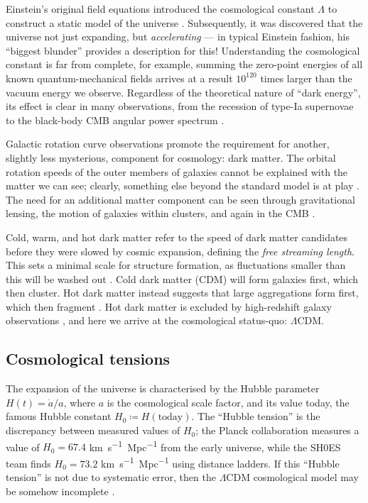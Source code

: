 \documentclass{article}
\begin{document}
Einstein's original field equations introduced the cosmological constant $\Lambda$ to construct a static model of the universe \cite{Einstein:1905ve}. Subsequently, it was discovered that the universe not just expanding, but \textit{accelerating} --- in typical Einstein fashion, his ``biggest blunder'' provides a description for this! Understanding the cosmological constant is far from complete, for example, summing the zero-point energies of all known quantum-mechanical fields arrives at a result $10^{120}$ times larger than the vacuum energy we observe. Regardless of the theoretical nature of ``dark energy'', its effect is clear in many observations, from the recession of type-Ia supernovae to the black-body CMB angular power spectrum \cite{hob-efs-las-2006}.

Galactic rotation curve observations promote the requirement for another, slightly less mysterious, component for cosmology: dark matter. The orbital rotation speeds of the outer members of galaxies cannot be explained with the matter we can see; clearly, something else beyond the standard model is at play \cite{existence-nature-dm}. The need for an additional matter component can be seen through gravitational lensing, the motion of galaxies within clusters, and again in the CMB \cite{Bertone-2018}. 

Cold, warm, and hot dark matter refer to the speed of dark matter candidates before they were slowed by cosmic expansion, defining the \textit{free streaming length}. This sets a minimal scale for structure formation, as fluctuations smaller than this will be washed out \cite{free-streaming}. Cold dark matter (CDM) will form galaxies first, which then cluster. Hot dark matter instead suggests that large aggregations form first, which then fragment \cite{silk2000big}. Hot dark matter is excluded by high-redshift galaxy observations \cite{Bertone_2005}, and here we arrive at the cosmological status-quo: $\Lambda$CDM.

\subsection{Cosmological tensions}
\label{ssec:tension}
The expansion of the universe is characterised by the Hubble parameter $H(t)=\dot{a}/a$, where $a$ is the cosmological scale factor, and its value today, the famous Hubble constant $H_0 \coloneqq H(\textrm{today})$. The ``Hubble tension'' is the discrepancy between measured values of $H_0$; the Planck collaboration measures a value of $H_0=67.4$ \unit{km.s^{-1}.Mpc^{-1}} from the early universe, while the SH0ES team finds $H_0=73.2$ \unit{km.s^{-1}.Mpc^{-1}} using distance ladders. If this ``Hubble tension'' is not due to systematic error, then the $\Lambda$CDM cosmological model may be somehow incomplete \cite{buyers-guide}.
\end{document}
